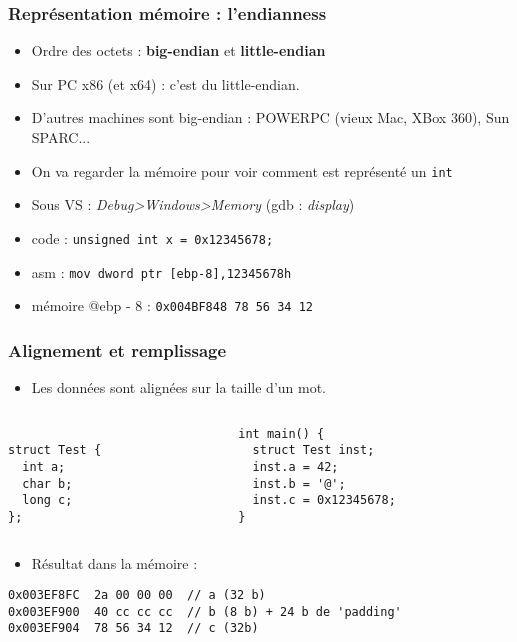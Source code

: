 \documentclass{beamer}
\begin{document}
\begin{frame}
\frametitle{Représentation mémoire : l'endianness}
\begin{itemize}
\item Ordre des octets : \textbf{big-endian} et \textbf{little-endian}  
\item Sur PC x86 (et x64) : c'est du little-endian.
\item D'autres machines sont big-endian : POWERPC (vieux Mac, XBox 360), Sun SPARC... 
\pause
\item On va regarder la mémoire pour voir comment est représenté un \lstinline+int+ 
\item Sous VS : \textit {Debug>Windows>Memory} (gdb : \textit{display})
\end{itemize}
\pause
\begin{itemize}
\item code : \lstinline+unsigned int x = 0x12345678;+
\item asm : \lstinline[language={[x86masm]Assembler}]+mov dword ptr [ebp-8],12345678h+
\item mémoire @ebp - 8 : \texttt{0x004BF848  78 56 34 12}
\end{itemize}



\end{frame}
\begin{frame}[fragile]
\frametitle{Alignement et remplissage}
\begin{itemize}
\item Les données sont alignées sur la taille d'un mot.
\end{itemize}
\begin{columns}
  \begin{column}{0.3\textwidth}
\begin{lstlisting}

struct Test {
  int a;
  char b;
  long c;
};
\end{lstlisting}
  \end{column}
  \begin{column}{0.5\textwidth}
\begin{lstlisting}
int main() {
  struct Test inst;
  inst.a = 42;
  inst.b = '@';
  inst.c = 0x12345678;
}
\end{lstlisting}
  \end{column}
\end{columns}
\pause
\begin{itemize}
\item Résultat dans la mémoire : 
\end{itemize}
\begin{lstlisting}
0x003EF8FC  2a 00 00 00  // a (32 b)  
0x003EF900  40 cc cc cc  // b (8 b) + 24 b de 'padding' 
0x003EF904  78 56 34 12  // c (32b) 
\end{lstlisting}

\end{frame}
\end{document}
